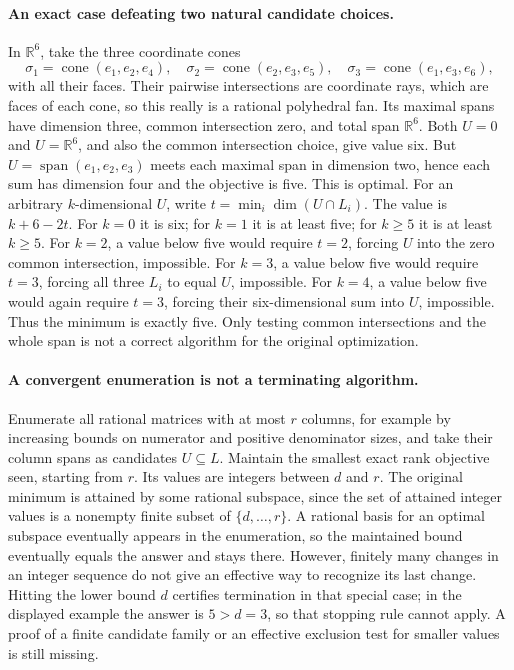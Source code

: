 \documentclass[11pt]{article}
\begin{document}
\paragraph{An exact case defeating two natural candidate choices.}
In $\mathbb R^6$, take the three coordinate cones
\[
 \sigma_1=\operatorname{cone}(e_1,e_2,e_4),\quad
 \sigma_2=\operatorname{cone}(e_2,e_3,e_5),\quad
 \sigma_3=\operatorname{cone}(e_1,e_3,e_6),
\]
with all their faces. Their pairwise intersections are coordinate rays,
which are faces of each cone, so this really is a rational polyhedral fan.
Its maximal spans have dimension three, common intersection zero, and total
span $\mathbb R^6$. Both $U=0$ and $U=\mathbb R^6$, and also the common
intersection choice, give value six.
But $U=\operatorname{span}(e_1,e_2,e_3)$ meets each maximal span in
dimension two, hence each sum has dimension four and the objective is five.
This is optimal. For an arbitrary $k$-dimensional $U$, write
$t=\min_i\dim(U\cap L_i)$. The value is $k+6-2t$.
For $k=0$ it is six; for $k=1$ it is at least five; for $k\geq5$ it is
at least $k\geq5$. For $k=2$, a value below five would require $t=2$,
forcing $U$ into the zero common intersection, impossible.
For $k=3$, a value below five would require $t=3$, forcing all three
$L_i$ to equal $U$, impossible. For $k=4$, a value below five would again
require $t=3$, forcing their six-dimensional sum into $U$, impossible.
Thus the minimum is exactly five. Only testing common intersections and the
whole span is not a correct algorithm for the original optimization.

\paragraph{A convergent enumeration is not a terminating algorithm.}
Enumerate all rational matrices with at most $r$ columns, for example by
increasing bounds on numerator and positive denominator sizes, and take their
column spans as candidates $U\subseteq L$. Maintain the smallest exact rank
objective seen, starting from $r$. Its values are integers between $d$ and $r$.
The original minimum is attained by some rational subspace, since the set of
attained integer values is a nonempty finite subset of $\{d,\ldots,r\}$.
A rational basis for an optimal subspace eventually appears in the enumeration,
so the maintained bound eventually equals the answer and stays there.
However, finitely many changes in an integer sequence do not give an effective
way to recognize its last change. Hitting the lower bound $d$ certifies
termination in that special case; in the displayed example the answer is
$5>d=3$, so that stopping rule cannot apply. A proof of a finite candidate
family or an effective exclusion test for smaller values is still missing.
\end{document}
